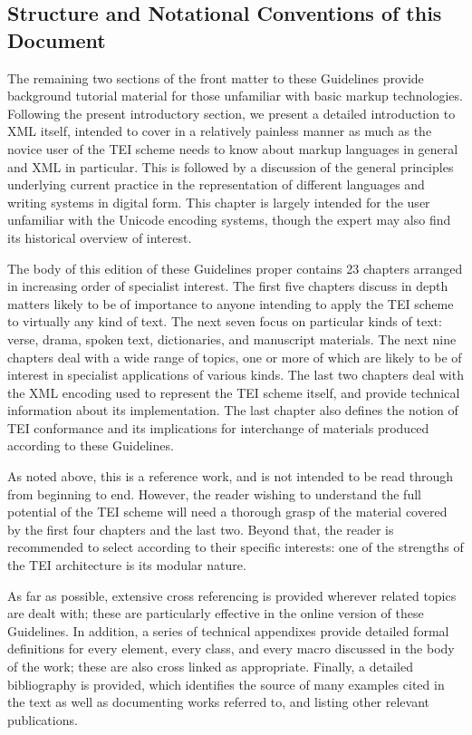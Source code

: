 \subsection[{Structure and Notational Conventions of this Document}]{Structure and Notational Conventions of this Document}\label{ABSTRUNC}\par
The remaining two sections of the front matter to these Guidelines provide background tutorial material for those unfamiliar with basic markup technologies. Following the present introductory section, we present a detailed introduction to XML itself, intended to cover in a relatively painless manner as much as the novice user of the TEI scheme needs to know about markup languages in general and XML in particular. This is followed by a discussion of the general principles underlying current practice in the representation of different languages and writing systems in digital form. This chapter is largely intended for the user unfamiliar with the Unicode encoding systems, though the expert may also find its historical overview of interest.\par
The body of this edition of these Guidelines proper contains 23 chapters arranged in increasing order of specialist interest. The first five chapters discuss in depth matters likely to be of importance to anyone intending to apply the TEI scheme to virtually any kind of text. The next seven focus on particular kinds of text: verse, drama, spoken text, dictionaries, and manuscript materials. The next nine chapters deal with a wide range of topics, one or more of which are likely to be of interest in specialist applications of various kinds. The last two chapters deal with the XML encoding used to represent the TEI scheme itself, and provide technical information about its implementation. The last chapter also defines the notion of TEI conformance and its implications for interchange of materials produced according to these Guidelines.\par
As noted above, this is a reference work, and is not intended to be read through from beginning to end. However, the reader wishing to understand the full potential of the TEI scheme will need a thorough grasp of the material covered by the first four chapters and the last two. Beyond that, the reader is recommended to select according to their specific interests: one of the strengths of the TEI architecture is its modular nature. \par
As far as possible, extensive cross referencing is provided wherever related topics are dealt with; these are particularly effective in the online version of these Guidelines. In addition, a series of technical appendixes provide detailed formal definitions for every element, every class, and every macro discussed in the body of the work; these are also cross linked as appropriate. Finally, a detailed bibliography is provided, which identifies the source of many examples cited in the text as well as documenting works referred to, and listing other relevant publications.\par
